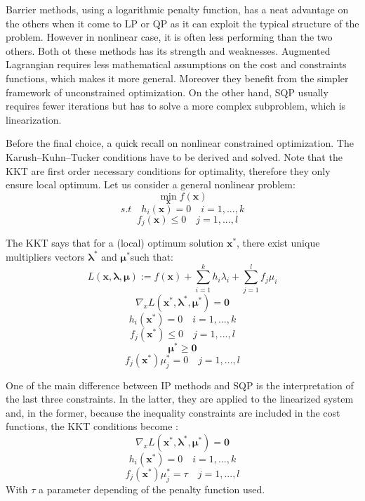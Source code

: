 \documentclass[a4paper, 12pt]{report}
\begin{document}
Barrier methods, using a logarithmic penalty function, has a neat advantage on the others when it come to LP or QP as it can exploit the typical structure of the problem. However in nonlinear case, it is often less performing than the two others. Both ot these methods has its strength and weaknesses. Augmented Lagrangian requires less mathematical assumptions on the cost and constraints functions, which makes it more general. Moreover they benefit from the simpler framework of unconstrained optimization. On the other hand, SQP usually requires fewer iterations but has to solve a more complex subproblem, which is linearization. \cite{Bertsekas1999, Ruszczynski2006, Nocedal1999, Haverbeke2011,Zheng2015, Tenny2002}

Before the final choice, a quick recall on nonlinear constrained optimization.
The Karush–Kuhn–Tucker conditions have to be derived and solved. Note that the KKT are first order necessary conditions for optimality, therefore they only ensure local optimum. Let us consider a general nonlinear problem:
\[ \min\limits_{\boldsymbol{x}} f(\boldsymbol{x}) \]
\[ s.t \quad h_i(\boldsymbol{x}) = 0 \quad i =1, ..., k \]
\[\quad f_j(\boldsymbol{x}) \leq 0 \quad j =1, ..., l \]

The KKT says that for a (local) optimum solution $\boldsymbol{x}^*$, there exist unique multipliers vectors $\boldsymbol{\lambda}^*$ and $\boldsymbol{\mu}^*$such that:
\[ L(\boldsymbol{x},\boldsymbol{\lambda},\boldsymbol{\mu}) := f(\boldsymbol{x}) + \sum_{i=1}^k h_i\lambda_i  + \sum_{j=1}^l f_j\mu_i \]
\[ \nabla_x L(\boldsymbol{x}^*,\boldsymbol{\lambda}^*,\boldsymbol{\mu}^*) =  \boldsymbol{0} \]
\[h_i(\boldsymbol{x}^*) = 0 \quad i =1, ..., k \]
\[f_j(\boldsymbol{x}^*) \leq 0 \quad j =1 ,..., l \] 
\[ \boldsymbol{\mu}^* \geq  \boldsymbol{0}  \]
\[f_j(\boldsymbol{x}^*) \mu_j^* = 0 \quad j =1, ..., l \]

One of the main difference between IP methods and SQP is the interpretation of the last three constraints. In the latter, they are applied to the linearized system and, in the former,  because the inequality constraints are included in the cost functions, the KKT conditions become \cite{Haverbeke2011}:
\[ \nabla_x L(\boldsymbol{x}^*,\boldsymbol{\lambda}^*,\boldsymbol{\mu}^*) =  \boldsymbol{0} \]
\[h_i(\boldsymbol{x}^*) = 0 \quad i =1, ..., k \]
\[f_j(\boldsymbol{x}^*) \mu_j^* = \tau \quad j =1, ..., l \]
With $\tau$ a parameter depending of the penalty function used.
\end{document}
